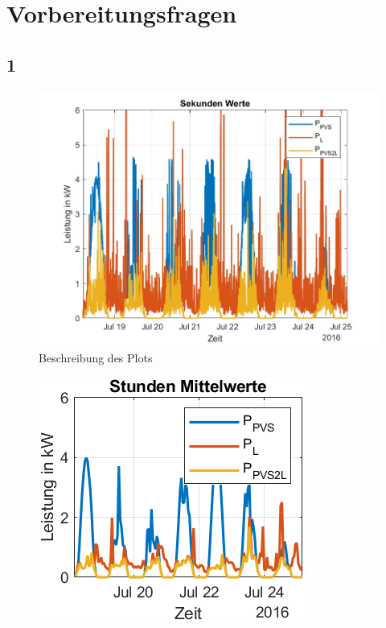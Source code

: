 \newpage
\section{Vorbereitungsfragen}
\subsection{1}
\begin{figure}[H]
    \centering
    \includegraphics[width=\textwidth]{Abbildungen/plot.jpg}
    \caption{Beschreibung des Plots}
    \label{fig:plot3062023}
\end{figure}
\begin{figure}[H]
    \centering
    \includegraphics[width=\textwidth]{Abbildungen/aufgabe1_plot2.png}
    \caption{}
    \label{fig:plot1_2_3062023}
\end{figure}
